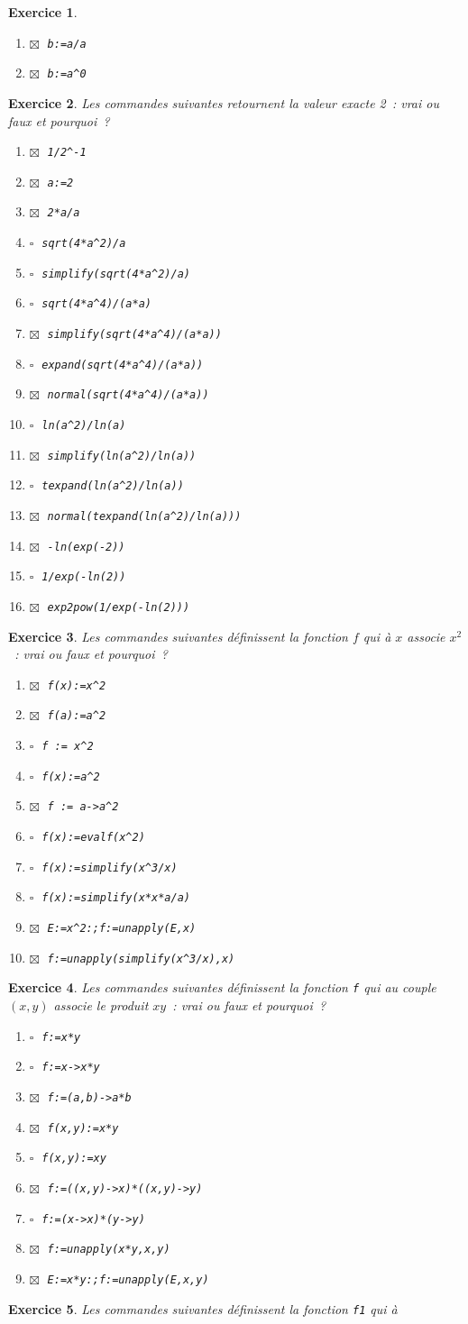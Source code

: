 \documentclass{article}
\newcommand{\faux}{$\square\;$}
\newcommand{\vrai}{$\boxtimes\;$}
\newcommand{\itemf}{\item\faux}
\newcommand{\itemvv}{\item\vrai}
\newtheorem{exo}{Exercice}[section]
\begin{document}
\begin{giacjshere}
\begin{exo}
{\begin{enumerate}
\verb|a:=1:; b:="a"|
\itemvv
\verb|b:=a/a|
\itemvv
\verb|b:=a^0|
\end{enumerate}
}\end{exo}
\begin{exo}{\rm
Les commandes suivantes retournent la valeur exacte 2~: 
vrai ou faux et pourquoi~?
\begin{enumerate}
\itemvv
\verb|1/2^-1|
\itemvv
\verb|a:=2|
\itemvv
\verb|2*a/a|
\itemf
\verb|sqrt(4*a^2)/a|
\itemf
\verb|simplify(sqrt(4*a^2)/a)|
\itemf
\verb|sqrt(4*a^4)/(a*a)|
\itemvv
\verb|simplify(sqrt(4*a^4)/(a*a))|
\itemf
\verb|expand(sqrt(4*a^4)/(a*a))|
\itemvv
\verb|normal(sqrt(4*a^4)/(a*a))|
\itemf
\verb|ln(a^2)/ln(a)|
\itemvv
\verb|simplify(ln(a^2)/ln(a))|
\itemf
\verb|texpand(ln(a^2)/ln(a))|
\itemvv
\verb|normal(texpand(ln(a^2)/ln(a)))|
\itemvv
\verb|-ln(exp(-2))|
\itemf
\verb|1/exp(-ln(2))|
\itemvv
\verb|exp2pow(1/exp(-ln(2)))|
\end{enumerate}
}\end{exo}
\begin{exo}{\rm
Les commandes suivantes d\'efinissent la fonction $f$ qui \`a $x$
associe $x^2$~: 
vrai ou faux et pourquoi~?
\begin{enumerate}
\itemvv
\verb|f(x):=x^2|
\itemvv
\verb|f(a):=a^2|
\itemf
\verb|f := x^2|
\itemf
\verb|f(x):=a^2|
\itemvv
\verb|f := a->a^2|
\itemf
\verb|f(x):=evalf(x^2)|
\itemf
\verb|f(x):=simplify(x^3/x)|
\itemf
\verb|f(x):=simplify(x*x*a/a)|
\itemvv
\verb|E:=x^2:;f:=unapply(E,x)|
\itemvv
\verb|f:=unapply(simplify(x^3/x),x)|
\end{enumerate}
}\end{exo}
\begin{exo}{\rm
Les commandes suivantes d\'efinissent la fonction \verb|f| qui au
couple $(x,y)$ associe le produit $xy$~: 
vrai ou faux et pourquoi~?
\begin{enumerate}
\itemf
\verb|f:=x*y|
\itemf
\verb|f:=x->x*y|
\itemvv
\verb|f:=(a,b)->a*b|
\itemvv
\verb|f(x,y):=x*y|
\itemf
\verb|f(x,y):=xy|
\itemvv
\verb|f:=((x,y)->x)*((x,y)->y)|
\itemf
\verb|f:=(x->x)*(y->y)|
\itemvv
\verb|f:=unapply(x*y,x,y)|
\itemvv
\verb|E:=x*y:;f:=unapply(E,x,y)|
\end{enumerate}
}\end{exo}
\begin{exo}{\rm
Les commandes suivantes d\'efinissent la fonction \verb|f1| qui \`a
}
\end{exo}
\end{giacjshere}
\end{document}
